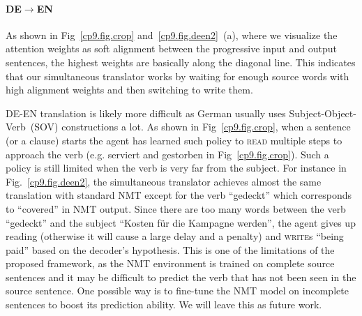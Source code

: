 

\paragraph{DE$\rightarrow$EN} 
As shown in Fig~\ref{cp9.fig.crop} and~\ref{cp9.fig.deen2}~(a), where we visualize the attention weights as soft alignment between the progressive input and output sentences, the highest weights are basically along the diagonal line. This indicates that our simultaneous translator works by waiting for enough source words with high alignment weights and then switching to write them. 

DE-EN translation is likely more difficult as German usually uses Subject-Object-Verb~(SOV) constructions a lot. %
As shown in Fig~\ref{cp9.fig.crop},
when a sentence (or a clause) starts the agent has learned such policy to \textsc{read} multiple steps to approach the verb (e.g. serviert and gestorben in Fig~\ref{cp9.fig.crop}). Such a policy is still limited when the verb is very far from the subject. For instance in Fig.~\ref{cp9.fig.deen2}, the simultaneous translator achieves almost the same translation with standard NMT except for the verb ``gedeckt'' which corresponds to ``covered'' in NMT output. Since there are too many words between the verb ``gedeckt'' and the subject ``Kosten f\"{u}r die Kampagne werden'', the agent gives up reading (otherwise it will cause a large delay and a penalty) and \textsc{write}s ``being paid'' based on the decoder's hypothesis. This is one of the limitations of the proposed framework, as the NMT environment is trained on complete source sentences and it may be difficult to predict the verb that has not been seen in the source sentence. 
One possible way is to fine-tune the NMT model on incomplete sentences to boost its prediction ability. We will leave this as future work.


